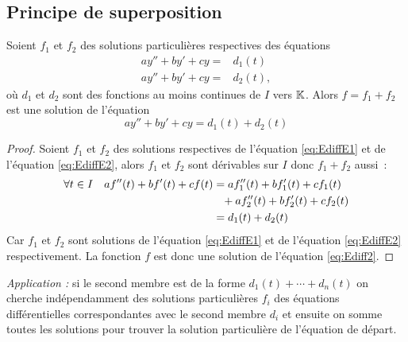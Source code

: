 \subsection{Principe de superposition}
\begin{prop}
  Soient \(f_1\) et \(f_2\) des solutions particulières respectives des équations
  \begin{align}
    ay''+by'+cy=&d_1(t) \label{eq:EdiffE1}\\ 
    ay''+by'+cy=&d_2(t) \label{eq:EdiffE2},
  \end{align}
où \(d_1\) et \(d_2\) sont des fonctions au moins continues de \(I\) vers \(\mathbb{K}\). Alors \(f=f_1+f_2\) est une solution de l'équation
\begin{equation}
  ay''+by'+cy=d_1(t)+d_2(t)
\end{equation}
\end{prop}
\begin{proof}
  Soient \(f_1\) et \(f_2\) des solutions respectives de l'équation \eqref{eq:EdiffE1} et de l'équation \eqref{eq:EdiffE2}, alors \(f_1\) et \(f_2\) sont dérivables sur \(I\) donc \(f_1+f_2\) aussi~:
  \begin{align}
    \forall t \in I \quad af''(t)+bf'(t)+cf(t)&=af_1''(t)+bf_1'(t)+cf_1(t) \notag \\ %
    &\phantom{=}+af_2''(t)+bf_2'(t)+cf_2(t)\\ &=d_1(t)+d_2(t)
  \end{align}
Car \(f_1\) et \(f_2\) sont solutions de l'équation \eqref{eq:EdiffE1} et de l'équation \eqref{eq:EdiffE2} respectivement. La fonction \(f\) est donc une solution de l'équation \eqref{eq:Ediff2}.
\end{proof}
\emph{Application :} si le second membre est de la forme \(d_1(t)+ \dotsb +d_n(t)\) on cherche indépendamment des solutions particulières \(f_i\) des équations différentielles correspondantes avec le second membre \(d_i\) et ensuite on somme toutes les solutions pour trouver la solution particulière de l'équation de départ.

